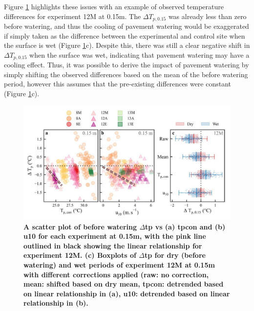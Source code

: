 \documentclass[final,3p,times,authoryear]{elsarticle}
\begin{document}
Figure \ref{fig:3.1} highlights these issues with an example of observed temperature differences for experiment 12M at 0.15m. The $\Delta$$T_{p,0.15}$ was already less than zero before watering, and thus the cooling of pavement watering would be exaggerated if simply taken as the difference between the experimental and control site when the surface is wet (Figure \ref{fig:3.1}c). Despite this, there was still a clear negative shift in $\Delta$$T_{p,0.15}$ when the surface was wet, indicating that pavement watering may have a cooling effect. Thus, it was possible to derive the impact of pavement watering by simply shifting the observed differences based on the mean of the before watering period, however this assumes that the pre-existing differences were constant (Figure \ref{fig:3.1}c).

\begin{figure}
\centering
\includegraphics[trim={0 0 0 0},clip,scale=1.2]{pict011.jpg}
\caption{\bf A scatter plot of before watering $\Delta$\gls{tp} vs (a) \gls{tpcon} and (b) \gls{u10} for each experiment at 0.15m, with the pink line outlined in black showing the linear relationship for experiment 12M. (c) Boxplots of $\Delta$\gls{tp} for dry (before watering) and wet periods of experiment 12M at 0.15m with different corrections applied (raw: no correction, mean: shifted based on dry mean, \gls{tpcon}: detrended based on linear relationship in (a), \gls{u10}: detrended based on linear relationship in (b).}
 \label{fig:3.1}
\end{figure}
\end{document}
